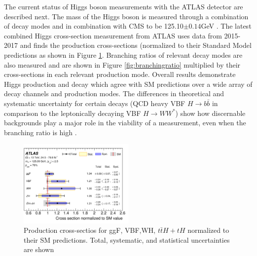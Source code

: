 The current status of Higgs boson measurements with the ATLAS detector are described next. The mass of the Higgs boson is measured through a combination of decay modes and in combination with CMS to be 125.10$\pm 0.14$GeV \cite{PDG}. The latest combined Higgs cross-section measurement from ATLAS uses data from 2015-2017 and finds the production cross-sections (normalized to their Standard Model predictions as shown in Figure \ref{fig:productioncrosssection}. Branching ratios of relevant decay modes are also measured and are shown in Figure \ref{fig:branchingratio} multiplied by their cross-sections in each relevant production mode. Overall results demonstrate Higgs production and decay which agree with SM predictions over a wide array of decay channels and production modes. The differences in theoretical and systematic uncertainty for certain decays (QCD heavy VBF $H\rightarrow b\bar{b}$ in comparison to the leptonically decaying VBF $H\rightarrow WW^*$) show how discernable backgrounds play a major role in the viability of a measurement, even when the branching ratio is high \cite{HiggsCurrent}.  
\begin{figure}[H]
        \centering
    \includegraphics[width=0.5\textwidth] {Pictures/productioncrosssection.png}\hspace{1cm}
    \caption{Production cross-sectios for ggF, VBF,WH, $t\bar{t}H+tH$ normalized to their SM predictions. Total, systematic, and statistical uncertainties are shown \cite{HiggsCurrent}}
    \label{fig:productioncrosssection}
\end{figure}

